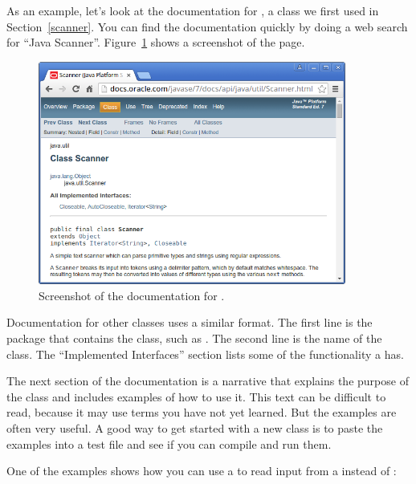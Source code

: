 As an example, let's look at the documentation for , a class we first used in Section~\ref{scanner}.
You can find the documentation quickly by doing a web search for ``Java Scanner''.
Figure~\ref{fig.scanner} shows a screenshot of the page.

\begin{figure}[!ht]
\begin{center}
\includegraphics[width=0.9\textwidth]{figs/scanner.png}
\caption{Screenshot of the documentation for .}
\label{fig.scanner}
\end{center}
\end{figure}

Documentation for other classes uses a similar format.
The first line is the package that contains the class, such as .
The second line is the name of the class.
The ``Implemented Interfaces'' section lists some of the functionality a  has.


The next section of the documentation is a narrative that explains the purpose of the class and includes examples of how to use it.
This text can be difficult to read, because it may use terms you have not yet learned.
But the examples are often very useful.
A good way to get started with a new class is to paste the examples into a test file and see if you can compile and run them.

One of the examples shows how you can use a  to read input from a  instead of :

